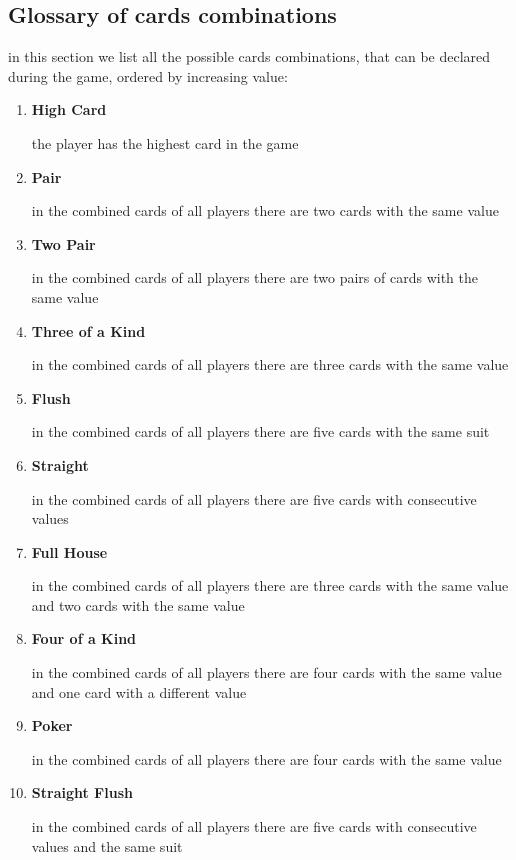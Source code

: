 \documentclass{scrartcl}
\begin{document}
\subsection{Glossary of cards combinations}\label{cards-combinations}  
in this section we list all the possible cards combinations, that can be declared during the game, ordered by increasing value:
\begin{enumerate}
  \item \textbf{High Card}\par
  the player has the highest card in the game
  \item \textbf{Pair}\par
  in the combined cards of all players there are two cards with the same value
  \item \textbf{Two Pair}\par
  in the combined cards of all players there are two pairs of cards with the same value
  \item \textbf{Three of a Kind}\par
  in the combined cards of all players there are three cards with the same value
  \item \textbf{Flush}\par
  in the combined cards of all players there are five cards with the same suit
  \item \textbf{Straight}\par
  in the combined cards of all players there are five cards with consecutive values
  \item \textbf{Full House}\par
  in the combined cards of all players there are three cards with the same value and two cards with the same value
  \item \textbf{Four of a Kind}\par
  in the combined cards of all players there are four cards with the same value and one card with a different value
  \item \textbf{Poker}\par
  in the combined cards of all players there are four cards with the same value
  \item \textbf{Straight Flush}\par
  in the combined cards of all players there are five cards with consecutive values and the same suit
\end{enumerate}
\end{document}
